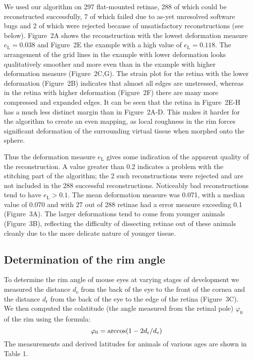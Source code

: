 \documentclass[10pt]{article}
\newcounter{Figure}
\begin{document}
We used our algorithm on 297 flat-mounted retinae, 288 of which could
be reconstructed successfully, 7 of which failed due to as-yet
unresolved software bugs and 2 of which were rejected because of
unsatisfactory reconstructions (see below). Figure~2A shows the
reconstruction with the lowest deformation measure
$e_\mathrm{L}=0.038$ and Figure~2E the example with a
high value of $e_\mathrm{L}=0.118$. The arrangement of
the grid lines in the example with lower deformation looks
qualitatively smoother and more even than in the example with higher
deformation measure (Figure~2C,G). The strain plot for the retina
with the lower deformation (Figure~2B) indicates that almost all
edges are unstressed, whereas in the retina with higher deformation
(Figure~2F) there are many more compressed and expanded edges. It can
be seen that the retina in Figure~2E{}-H has a much less distinct
margin than in Figure~2A-D. This makes it harder for the algorithm to
create an even mapping, as local roughness in the rim forces
significant deformation of the surrounding virtual tissue when
morphed onto the sphere. 

Thus the deformation measure $e_\mathrm{L}$ gives some
indication of the apparent quality of the reconstruction.  A value
greater than 0.2 indicates a problem with the stitching part of the
algorithm; the 2 such reconstructions were rejected and are not
included in the 288 successful reconstructions. Noticeably bad
reconstructions tend to have
$e_\mathrm{L}>0.1$. The mean deformation
measure was 0.071, with a median value of 0.070 and with 27 out of
288 retinae had a error measure exceeding 0.1 (Figure~3A). The larger
deformations tend to come from younger animals (Figure~3B),
reflecting the difficulty of dissecting retinae out of these animals
cleanly due to the more delicate nature of younger tissue. 

\subsection*{Determination of the rim angle}
To determine the rim angle of mouse eyes at varying stages of
development we measured the distance $d_\mathrm{e}$ from
the back of the eye to the front of the cornea and the distance
$d_\mathrm{r}$ from the back of the eye to the edge of
the retina (Figure~3C). We then computed the colatitude (the angle
measured from the retinal pole)   $\varphi _0$ of the rim using the
formula:
\begin{equation}
\varphi _0=\arccos (1-2d_{\text r}/d_{\text e})
\end{equation}
The measurements and derived latitudes for animals of various ages are
shown in Table 1. 
\end{document}
